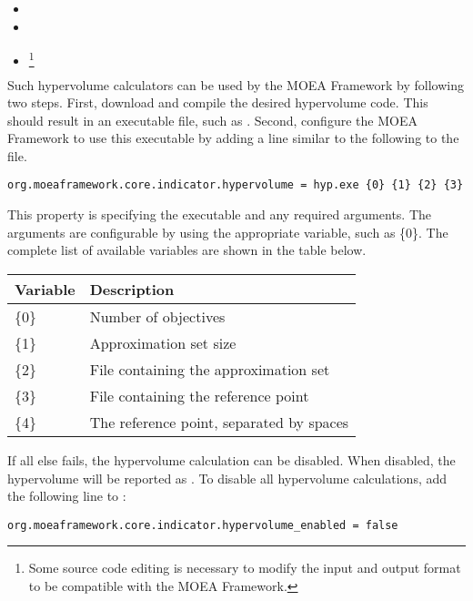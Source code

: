 \begin{itemize}
  \item {}
  \item {}
  \item {}\footnote{Some source code editing is necessary to modify the input and output format to be compatible with the MOEA Framework.}
\end{itemize}

Such hypervolume calculators can be used by the MOEA Framework by following two steps.  First, download and compile the desired hypervolume code.  This should result in an executable file, such as .  Second, configure the MOEA Framework to use this executable by adding a line similar to the following to the  file.

\begin{lstlisting}[language=Plaintext]
org.moeaframework.core.indicator.hypervolume = hyp.exe {0} {1} {2} {3}
\end{lstlisting}

This property is specifying the executable and any required arguments.  The arguments are configurable by using the appropriate variable, such as \{0\}.  The complete list of available variables are shown in the table below.

\begin{center}
\begin{tabular}{ll}
  Variable & Description \\
  \hline
  \{0\} & Number of objectives \\
  \{1\} & Approximation set size \\
  \{2\} & File containing the approximation set \\
  \{3\} & File containing the reference point \\
  \{4\} & The reference point, separated by spaces
\end{tabular}
\end{center}

If all else fails, the hypervolume calculation can be disabled.  When disabled, the hypervolume will be reported as .  To disable all hypervolume calculations, add the following line to :

\begin{lstlisting}[language=Plaintext]
org.moeaframework.core.indicator.hypervolume_enabled = false
\end{lstlisting}

